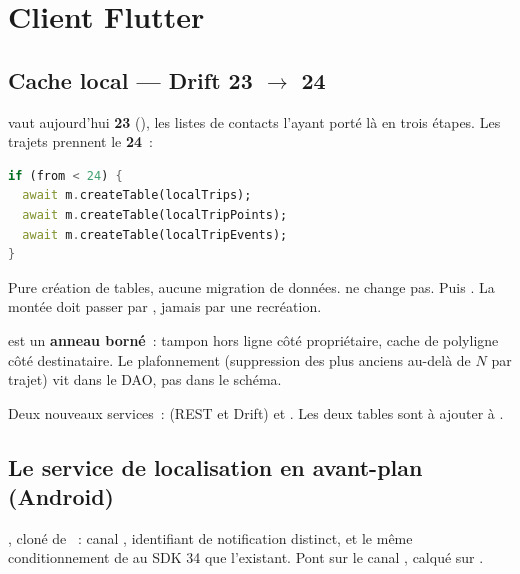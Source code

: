 \chapter{Client Flutter}

\section{Cache local --- Drift 23 $\rightarrow$ 24}

 vaut aujourd'hui \textbf{23} (),
les listes de contacts l'ayant porté là en trois étapes. Les trajets prennent le \textbf{24}~:

\begin{lstlisting}[language=Dart, numbers=none]
if (from < 24) {
  await m.createTable(localTrips);
  await m.createTable(localTripPoints);
  await m.createTable(localTripEvents);
}
\end{lstlisting}

Pure création de tables, aucune migration de données.  ne change pas.
Puis . La montée doit
passer par , jamais par une recréation.

 est un \textbf{anneau borné}~: tampon hors ligne côté propriétaire,
cache de polyligne côté destinataire. Le plafonnement (suppression des plus anciens au-delà
de $N$ par trajet) vit dans le DAO, pas dans le schéma.

Deux nouveaux services~:  (REST et Drift) et
. Les deux tables sont à ajouter à
.

\section{Le service de localisation en avant-plan (Android)}

, cloné de ~:
canal , identifiant de notification distinct, et le même
conditionnement de  au SDK 34 que l'existant. Pont
 sur le canal ,
calqué sur .

